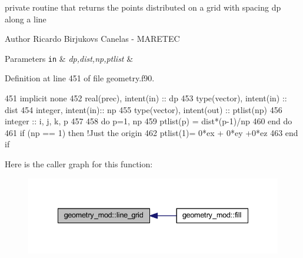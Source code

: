 private routine that returns the points distributed on a grid with spacing dp along a line 

\begin{DoxyAuthor}{Author}
Ricardo Birjukovs Canelas -\/ M\+A\+R\+E\+T\+EC 
\end{DoxyAuthor}

\begin{DoxyParams}[1]{Parameters}
\mbox{\tt in}  & {\em dp,dist,np,ptlist} & \\
\hline
\end{DoxyParams}


Definition at line 451 of file geometry.\+f90.


\begin{DoxyCode}
451     \textcolor{keywordtype}{implicit none}
452     \textcolor{keywordtype}{real(prec)}, \textcolor{keywordtype}{intent(in)} :: dp
453     \textcolor{keywordtype}{type}(vector), \textcolor{keywordtype}{intent(in)} :: dist
454     \textcolor{keywordtype}{integer}, \textcolor{keywordtype}{intent(in)}::  np
455     \textcolor{keywordtype}{type}(vector), \textcolor{keywordtype}{intent(out)} :: ptlist(np)
456     \textcolor{keywordtype}{integer} :: i, j, k, p
457 
458     \textcolor{keywordflow}{do} p=1, np
459         ptlist(p) = dist*(p-1)/np
460 \textcolor{keywordflow}{    end do}
461     \textcolor{keywordflow}{if} (np == 1) \textcolor{keywordflow}{then} \textcolor{comment}{!Just the origin}
462         ptlist(1)= 0*ex + 0*ey +0*ez
463 \textcolor{keywordflow}{    end if}
\end{DoxyCode}
Here is the caller graph for this function\+:\nopagebreak
\begin{figure}[H]
\begin{center}
\leavevmode
\includegraphics[width=335pt]{namespacegeometry__mod_abcb09c0f5274c27cb79b0dd009ed94b3_icgraph}
\end{center}
\end{figure}
\mbox{\label{namespacegeometry__mod_aed4426181ca851b41717edd50268e5f3}} 
